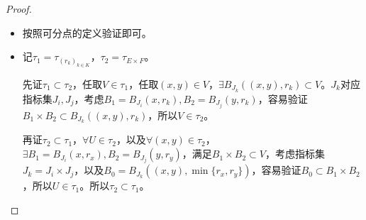 \begin{proof}
	\begin{itemize}
		\item 按照可分点的定义验证即可。
		\item 记$\tau_{1}=\tau_{(r_{k})_{k\in K}} $，$\tau_{2}=\tau_{E\times F} $。\par
		先证$\tau_{1}\subset \tau_{2} $，任取$V\in \tau_{1} $，任取$(x,y)\in V $，$\exists B_{J_{k}}((x,y),r_{k})\subset V $。$J_{k} $对应指标集$J_{i},J_{j} $，考虑$B_{1}=B_{J_{i}}(x,r_{k}),B_{2}=B_{J_{j}}(y,r_{k})$，容易验证$B_{1}\times B_{2}\subset B_{J_{k}}((x,y),r_{k}) $，所以$V\in \tau_{2}$。\par
		再证$\tau_{2}\subset \tau_{1} $，$\forall U\in \tau_{2} $，以及$\forall (x,y)\in \tau_{2}$，$\exists B_{1}=B_{J_{i}}(x,r_{x}),B_{2}=B_{J_{j}}(y,r_{y}) $，满足$B_{1}\times B_{2}\subset V $，考虑指标集$J_{k}=J_{i}\times J_{j} $，以及$B_{0}=B_{J_{k}}((x,y),\min\{r_{x},r_{y}\}) $，容易验证$B_{0}\subset B_{1}\times B_{2} $，所以$U\in \tau_{1} $。所以$\tau_{2}\subset \tau_{1} $。
	\end{itemize}
\end{proof}	










